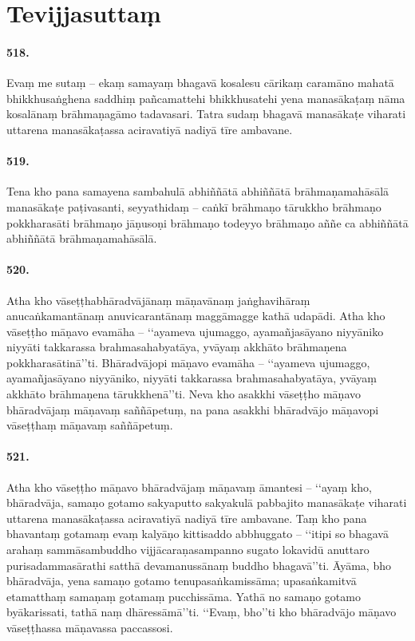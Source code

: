 \section{Tevijjasuttaṃ}

\paragraph{518.} Evaṃ me sutaṃ – ekaṃ samayaṃ bhagavā kosalesu cārikaṃ caramāno mahatā bhikkhusaṅghena saddhiṃ pañcamattehi bhikkhusatehi yena manasākaṭaṃ nāma kosalānaṃ brāhmaṇagāmo tadavasari. Tatra sudaṃ bhagavā manasākaṭe viharati uttarena manasākaṭassa aciravatiyā nadiyā tīre ambavane.

\paragraph{519.} Tena kho pana samayena sambahulā abhiññātā abhiññātā brāhmaṇamahāsālā manasākaṭe paṭivasanti, seyyathidaṃ – caṅkī brāhmaṇo tārukkho brāhmaṇo pokkharasāti brāhmaṇo jāṇusoṇi brāhmaṇo todeyyo brāhmaṇo aññe ca abhiññātā abhiññātā brāhmaṇamahāsālā.

\paragraph{520.} Atha kho vāseṭṭhabhāradvājānaṃ māṇavānaṃ jaṅghavihāraṃ anucaṅkamantānaṃ anuvicarantānaṃ maggāmagge kathā udapādi. Atha kho vāseṭṭho māṇavo evamāha – ‘‘ayameva ujumaggo, ayamañjasāyano niyyāniko niyyāti takkarassa brahmasahabyatāya, yvāyaṃ akkhāto brāhmaṇena pokkharasātinā’’ti. Bhāradvājopi māṇavo evamāha – ‘‘ayameva ujumaggo, ayamañjasāyano niyyāniko, niyyāti takkarassa brahmasahabyatāya, yvāyaṃ akkhāto brāhmaṇena tārukkhenā’’ti. Neva kho asakkhi vāseṭṭho māṇavo bhāradvājaṃ māṇavaṃ saññāpetuṃ, na pana asakkhi bhāradvājo māṇavopi vāseṭṭhaṃ māṇavaṃ saññāpetuṃ.

\paragraph{521.} Atha kho vāseṭṭho māṇavo bhāradvājaṃ māṇavaṃ āmantesi – ‘‘ayaṃ kho, bhāradvāja, samaṇo gotamo sakyaputto sakyakulā pabbajito manasākaṭe viharati uttarena manasākaṭassa aciravatiyā nadiyā tīre ambavane. Taṃ kho pana bhavantaṃ gotamaṃ evaṃ kalyāṇo kittisaddo abbhuggato – ‘‘itipi so bhagavā arahaṃ sammāsambuddho vijjācaraṇasampanno sugato lokavidū anuttaro purisadammasārathi satthā devamanussānaṃ buddho bhagavā’’ti. Āyāma, bho bhāradvāja, yena samaṇo gotamo tenupasaṅkamissāma; upasaṅkamitvā etamatthaṃ samaṇaṃ gotamaṃ pucchissāma. Yathā no samaṇo gotamo byākarissati, tathā naṃ dhāressāmā’’ti. ‘‘Evaṃ, bho’’ti kho bhāradvājo māṇavo vāseṭṭhassa māṇavassa paccassosi.

